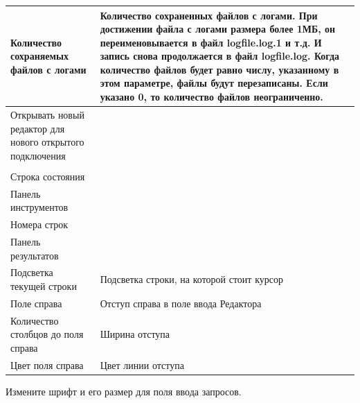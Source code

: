 \begin{longtable}[r]{|>{\ttfamily}m{6cm}|m{9cm}|}
	Количество сохраняемых файлов с логами
	& Количество сохраненных файлов с логами. При достижении файла с логами размера более 1МБ, он переименовывается в файл logfile.log.1 и т.д. И запись снова продолжается в файл logfile.log. Когда количество файлов будет равно числу, указанному в этом параметре, файлы будут перезаписаны. Если указано 0, то количество файлов неограниченно.\\\hline
	Открывать новый редактор для нового открытого подключения
	&  \\\hline
	\rowcolor[gray]{.9}\multicolumn{2}{|m{15.25cm}|}{\bfseries Настройки отображения}\\\hline     
	Строка состояния
	&  \\\hline
	Панель инструментов
	&  \\\hline
	Номера строк
	&  \\\hline
	Панель результатов
	& \\\hline
	Подсветка текущей строки
	& Подсветка строки, на которой стоит курсор \\\hline
	Поле справа
	& Отступ справа в поле ввода Редактора\\\hline
	Количество столбцов до поля справа
	& Ширина отступа\\\hline
	Цвет поля справа
	& Цвет линии отступа \\\hline      
\end{longtable}


Измените шрифт и его размер для поля ввода запросов.



